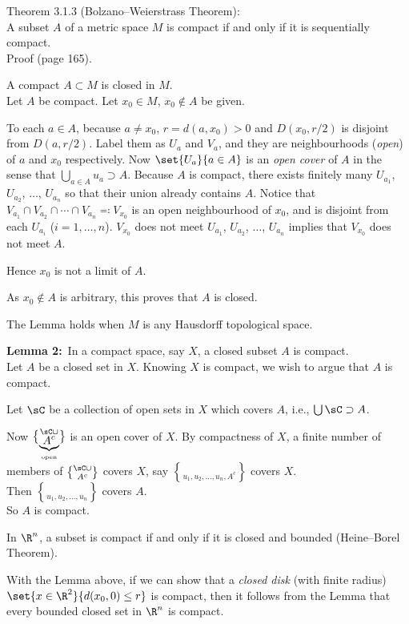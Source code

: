 Theorem 3.1.3 (Bolzano--Weierstrass Theorem): \\
A subset $A$ of a metric space $M$ is compact if and only if it is sequentially compact. \\
Proof (page 165).

\lem A compact $A\subset M$ is closed in $M$. \\
\pf Let $A$ be compact.  Let $x_0\in M$, $x_0\notin A$ be given.

To each $a\in A$, because $a\neq x_0$, $r=d(a,x_0)>0$ and $D(x_0,r/2)$ is disjoint from $D(a,r/2)$.  Label them as $U_a$ and $V_a$, and they are neighbourhoods (\emph{open}) of $a$ and $x_0$ respectively.  Now $\set{U_a}{a\in A}$ is an \emph{open cover} of $A$ in the sense that $\bigcup_{a\in A}u_a\supset A$.  Because $A$ is compact, there exists finitely many $U_{a_1}$, $U_{a_2}$, $\dotsc$, $U_{a_n}$ so that their union already contains $A$.  Notice that $V_{a_1}\cap V_{a_2}\cap\dotsb\cap V_{a_n}\eqqcolon V_{x_0}$ is an open neighbourhood of $x_0$, and is disjoint from each $U_{a_i}$ ($i=1,\dotsc,n$).  $V_{x_0}$ does not meet $U_{a_1}$, $U_{a_2}$, $\dotsc$, $U_{a_n}$ implies that $V_{x_0}$ does not meet $A$.

Hence $x_0$ is not a limit of $A$.

As $x_0\notin A$ is arbitrary, this proves that $A$ is closed.

\comment The Lemma holds when $M$ is any Hausdorff topological space.

\textbf{Lemma 2:}~In a compact space, say $X$, a closed subset $A$ is compact. \\
\pf Let $A$ be a closed set in $X$.  Knowing $X$ is compact, we wish to argue that $A$ is compact.

Let $\sC$ be a collection of open sets in $X$ which covers $A$, i.e., $\bigcup\sC\supset A$.

Now $\sC\cup\brace{\underbrace{A^c}_\text{open}}$ is an open cover of $X$.  By compactness of $X$, a finite number of members of $\sC\cup\brace{A^c}$ covers $X$, say $\brace{u_1,u_2,\dotsc,u_n,A^c}$ covers $X$. \\
Then $\brace{u_1,u_2,\dotsc,u_n}$ covers $A$. \\
So $A$ is compact.

\comment In $\R^n$, a subset is compact if and only if it is closed and bounded (Heine--Borel Theorem).

With the Lemma above, if we can show that a \emph{closed disk} (with finite radius) $\set{x\in\R^2}{d(x_0,0)\leq r}$ is compact, then it follows from the Lemma that every bounded closed set in $\R^n$ is compact.
